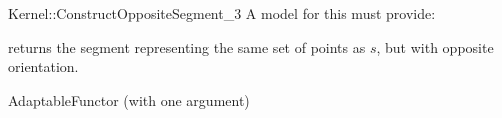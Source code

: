 \begin{ccRefFunctionObjectConcept}{Kernel::ConstructOppositeSegment_3}
A model for this must provide:


{returns the segment representing the same set of points as $s$,
but with opposite orientation.}

\ccRefines
AdaptableFunctor (with one argument)

\ccSeeAlso
{} \\

\end{ccRefFunctionObjectConcept}
